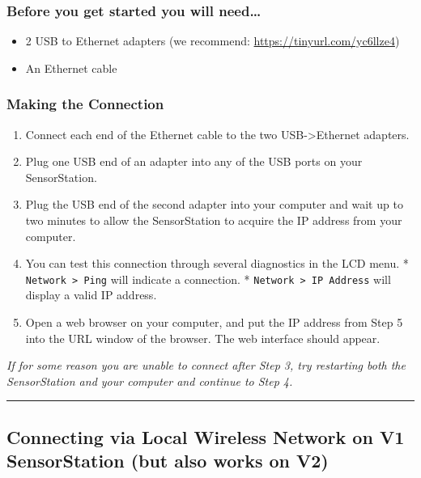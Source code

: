 \documentclass[
]{article}
\providecommand{\tightlist}{%
  \setlength{\itemsep}{0pt}\setlength{\parskip}{0pt}}
\begin{document}
\hypertarget{before-you-get-started-you-will-need}{%
\subsubsection{Before you get started you will
need\ldots{}}\label{before-you-get-started-you-will-need}}

\begin{itemize}
\tightlist
\item
  2 USB to Ethernet adapters (we recommend:
  \url{https://tinyurl.com/yc6llze4})
\item
  An Ethernet cable
\end{itemize}

\hypertarget{making-the-connection}{%
\subsubsection{Making the Connection}\label{making-the-connection}}

\begin{enumerate}
\def\labelenumi{\arabic{enumi}.}
\tightlist
\item
  Connect each end of the Ethernet cable to the two
  USB-\textgreater Ethernet adapters.
\item
  Plug one USB end of an adapter into any of the USB ports on your
  SensorStation.
\item
  Plug the USB end of the second adapter into your computer and wait up
  to two minutes to allow the SensorStation to acquire the IP address
  from your computer.
\item
  You can test this connection through several diagnostics in the LCD
  menu. * \texttt{Network\ \textgreater{}\ Ping} will indicate a
  connection. * \texttt{Network\ \textgreater{}\ IP\ Address} will
  display a valid IP address.
\item
  Open a web browser on your computer, and put the IP address from Step
  5 into the URL window of the browser. The web interface should appear.
\end{enumerate}

\emph{If for some reason you are unable to connect after Step 3, try
restarting both the SensorStation and your computer and continue to Step
4.}

\begin{center}\rule{0.5\linewidth}{0.5pt}\end{center}

\hypertarget{connecting-via-local-wireless-network-on-v1-sensorstation-but-also-works-on-v2}{%
\subsection{\texorpdfstring{Connecting via Local Wireless Network on
\textbf{V1 SensorStation} (but also works on
V2)}{Connecting via Local Wireless Network on V1 SensorStation (but also works on V2)}}\label{connecting-via-local-wireless-network-on-v1-sensorstation-but-also-works-on-v2}}
\end{document}

